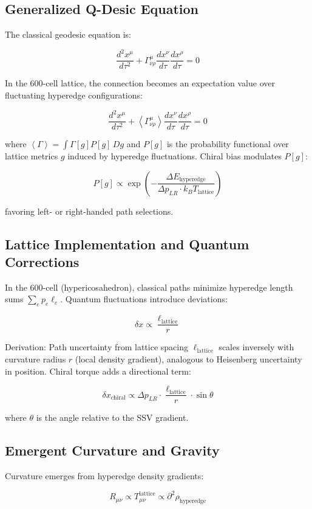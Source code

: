 \documentclass[11pt]{article}
\begin{document}
\subsection{Generalized Q-Desic Equation}
The classical geodesic equation is:

\[
\frac{d^2 x^\mu}{d\tau^2} + \Gamma^\mu_{\nu\rho} \frac{dx^\nu}{d\tau} \frac{dx^\rho}{d\tau} = 0
\]

In the 600-cell lattice, the connection becomes an expectation value over fluctuating hyperedge configurations:

\[
\frac{d^2 x^\mu}{d\tau^2} + \left\langle \Gamma^\mu_{\nu\rho} \right\rangle \frac{dx^\nu}{d\tau} \frac{dx^\rho}{d\tau} = 0
\]

where $\left\langle \Gamma \right\rangle = \int \Gamma[g] P[g] \, Dg$ and $P[g]$ is the probability functional over lattice metrics $g$ induced by hyperedge fluctuations. Chiral bias modulates $P[g]$:

\[
P[g] \propto \exp\left( -\frac{\Delta E_{\text{hyperedge}}}{\Delta p_{LR} \cdot k_B T_{\text{lattice}}} \right)
\]

favoring left- or right-handed path selections.

\subsection{Lattice Implementation and Quantum Corrections}
In the 600-cell (hypericosahedron), classical paths minimize hyperedge length sums $\sum_e p_e \ell_e$. Quantum fluctuations introduce deviations:

\[
\delta x \propto \frac{\ell_{\text{lattice}}}{r}
\]

Derivation: Path uncertainty from lattice spacing $\ell_{\text{lattice}}$ scales inversely with curvature radius $r$ (local density gradient), analogous to Heisenberg uncertainty in position. Chiral torque adds a directional term:

\[
\delta x_{\text{chiral}} \propto \Delta p_{LR} \cdot \frac{\ell_{\text{lattice}}}{r} \cdot \sin\theta
\]

where $\theta$ is the angle relative to the SSV gradient.

\subsection{Emergent Curvature and Gravity}
Curvature emerges from hyperedge density gradients:

\[
R_{\mu\nu} \propto T_{\mu\nu}^{\text{lattice}} \propto \partial^2 \rho_{\text{hyperedge}}
\]
\end{document}
